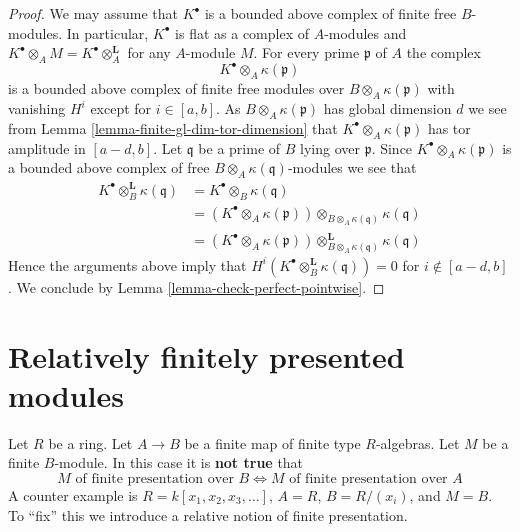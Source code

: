 \begin{proof}
We may assume that $K^\bullet$ is a bounded above complex of
finite free $B$-modules. In particular, $K^\bullet$ is flat as a
complex of $A$-modules and
$K^\bullet \otimes_A M = K^\bullet \otimes_A^{\mathbf{L}}$ for any
$A$-module $M$. For every prime $\mathfrak p$ of $A$ the complex
$$
K^\bullet \otimes_A \kappa(\mathfrak p)
$$
is a bounded above complex of finite free modules over
$B \otimes_A \kappa(\mathfrak p)$ with vanishing $H^i$ except
for $i \in [a, b]$. As $B \otimes_A \kappa(\mathfrak p)$
has global dimension $d$ we see from
Lemma \ref{lemma-finite-gl-dim-tor-dimension}
that $K^\bullet \otimes_A \kappa(\mathfrak p)$ has tor amplitude in
$[a - d, b]$. Let $\mathfrak q$ be a prime of $B$ lying over $\mathfrak p$.
Since $K^\bullet \otimes_A \kappa(\mathfrak p)$ is a bounded above
complex of free $B \otimes_A \kappa(\mathfrak q)$-modules we see
that
\begin{align*}
K^\bullet \otimes_B^{\mathbf{L}} \kappa(\mathfrak q)
& = K^\bullet \otimes_B \kappa(\mathfrak q) \\
& = (K^\bullet \otimes_A \kappa(\mathfrak p))
\otimes_{B \otimes_A \kappa(\mathfrak q)} \kappa(\mathfrak q) \\
& = (K^\bullet \otimes_A \kappa(\mathfrak p))
\otimes^{\mathbf{L}}_{B \otimes_A \kappa(\mathfrak q)} \kappa(\mathfrak q)
\end{align*}
Hence the arguments above imply that
$H^i(K^\bullet \otimes_B^{\mathbf{L}} \kappa(\mathfrak q)) = 0$
for $i \not \in [a - d, b]$. We conclude by
Lemma \ref{lemma-check-perfect-pointwise}.
\end{proof}















\section{Relatively finitely presented modules}
\label{section-relative-finite-presentation}

\noindent
Let $R$ be a ring. Let $A \to B$ be a finite map of finite type $R$-algebras.
Let $M$ be a finite $B$-module. In this case it is {\bf not true} that
$$
M\text{ of finite presentation over }B
\Leftrightarrow
M\text{ of finite presentation over }A
$$
A counter example is $R = k[x_1, x_2, x_3, \ldots]$, $A = R$, $B = R/(x_i)$,
and $M = B$. To ``fix'' this we introduce a relative notion of finite
presentation.

